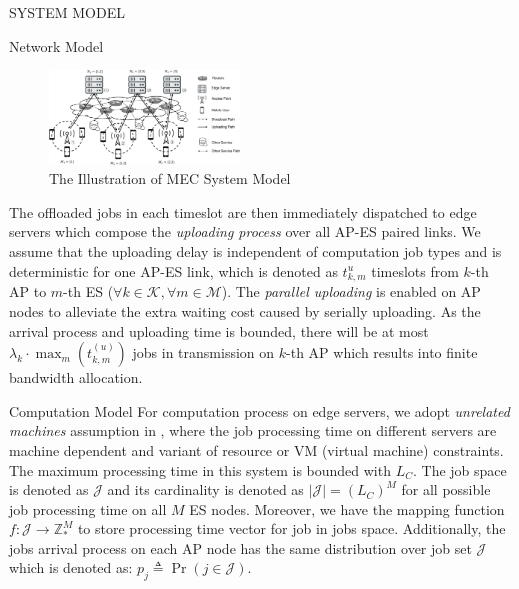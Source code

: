 \documentclass[10pt, conference, letterpaper]{IEEEtran}
\newcommand{\domZ}{\mathbb{Z}_{*}}
\newcommand{\define}{\triangleq}
\newcommand{\apSet}{\mathcal{K}}
\newcommand{\esSet}{\mathcal{M}}
\newcommand{\jSpace}{\mathcal{J}}
\begin{document}
\begin{section}{SYSTEM MODEL}
\begin{subsection}{Network Model}
            \begin{figure}[ht]
                \centering
                \includegraphics[width=0.45\textwidth, trim={0.5cm 0.5cm 0.5cm 0.5cm}, clip]{system-model.pdf}
                \caption{The Illustration of MEC System Model}
                \label{fig:system}
            \end{figure}

            The offloaded jobs in each timeslot are then immediately dispatched to edge servers which compose the \emph{uploading process} over all AP-ES paired links. We assume that the uploading delay is independent of computation job types and is deterministic for one AP-ES link, which is denoted as $t^{u}_{k,m}$ timeslots from $k$-th AP to $m$-th ES ($\forall k\in\apSet, \forall m\in\esSet$).
            The \emph{parallel uploading} is enabled on AP nodes to alleviate the extra waiting cost caused by serially uploading. As the arrival process and uploading time is bounded, there will be at most $\lambda_k \cdot \max_m(t^{(u)}_{k,m})$ jobs in transmission on $k$-th AP which results into finite bandwidth allocation.
        \end{subsection}

        \begin{subsection}{Computation Model}
            For computation process on edge servers, we adopt \emph{unrelated machines} assumption in \cite{tan-online}, where the job processing time on different servers are machine dependent and variant of resource or VM (virtual machine) constraints.
            The maximum processing time in this system is bounded with $L_C$.
            The job space is denoted as $\jSpace$ and its cardinality is denoted as $|\jSpace|=(L_C)^M$ for all possible job processing time on all $M$ ES nodes.
            Moreover, we have the mapping function $f:\jSpace \to \domZ^M$ to store processing time vector for job in jobs space.
            Additionally, the jobs arrival process on each AP node has the same distribution over job set $\jSpace$ which is denoted as: $p_j \define \Pr(j\in\jSpace)$.
            

\end{subsection}
\end{section}
\end{document}
